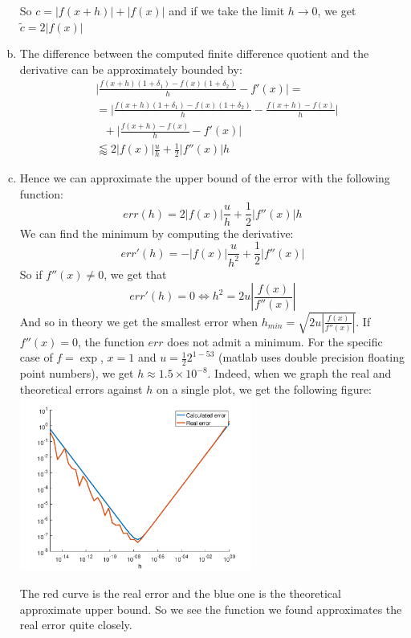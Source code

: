 \documentclass{article}
\begin{document}
\begin{enumerate}[(a)]
      So $c = |f(x + h)| + |f(x)|$ and if we take the limit
      $h \to 0$, we get $\tilde{c} = 2|f(x)|$
   \item 
      The difference between the computed finite difference quotient and the 
      derivative can be approximately bounded by:
      \begin{align*}
         &\Bigg|\frac{f(x+h)(1 + \delta_1) - f(x)(1 + \delta_2)}{h}
         - f'(x)\Bigg| = \\
         &= 
         \Bigg|\frac{f(x+h)(1 + \delta_1) - f(x)(1 + \delta_2)}{h} -
         \frac{f(x+h) - f(x)}{h}\Bigg| \\
         &~~~+ \Bigg|\frac{f(x+h) - f(x)}{h} - f'(x)\Bigg| \\
         &\lessapprox 2|f(x)|\frac{u}{h} + \frac{1}{2}|f''(x)|h
      \end{align*}
   \item
      Hence we can approximate the upper bound of the error with the following function:
      \begin{equation}
         err(h) = 2|f(x)|\frac{u}{h} + \frac{1}{2}|f''(x)|h
      \end{equation}
      We can find the minimum by computing the derivative:
      \begin{equation}
         err'(h) = -|f(x)|\frac{u}{h^2} + \frac{1}{2}|f''(x)|
      \end{equation}
      So if $f''(x) \neq 0$, we get that
      \begin{equation}
         err'(h) = 0 \iff h^2 = 2u\left|\frac{f(x)}{f''(x)}\right|
      \end{equation}
      And so in theory we get the smallest error when
      $h_{min} = \sqrt{2u\left|\frac{f(x)}{f''(x)}\right|}$.
      If $f''(x) = 0$, the function $err$ does not admit a minimum.
      For the specific case of $f = \exp$, $x = 1$ and
      $u = \frac{1}{2}2^{1 - 53}$ (matlab uses double precision floating
      point numbers), we get $h \approx 1.5 \times 10^{-8}$.
      Indeed, when we graph the real and theoretical errors against $h$ on a single plot, we
      get the following figure:\\
      \includegraphics[width=0.6\textwidth]{figure}

      The red curve is the real error and the blue one is the
		theoretical approximate upper bound.
      So we see the function we found approximates the real error
		quite closely.
\end{enumerate}
\end{document}
